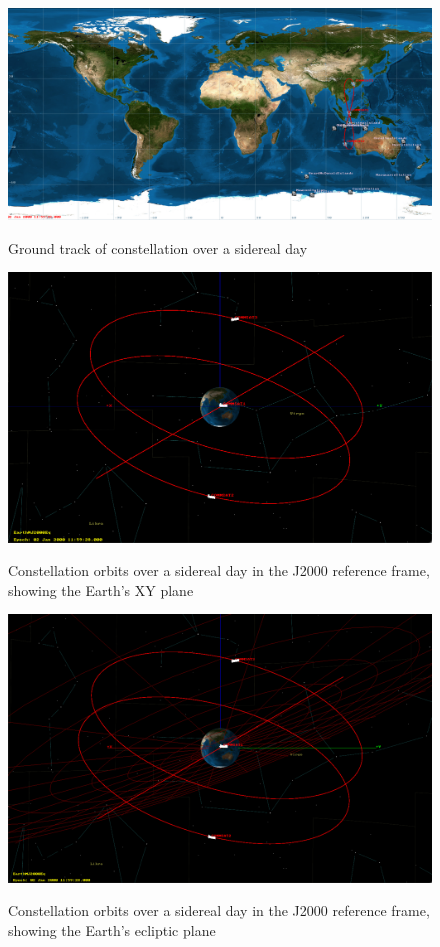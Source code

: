 \documentclass[12pt]{article}
\begin{document}
\begin{figure}[H]
    \centering
    \includegraphics[width=\linewidth]{figures/GroundTrack.png}\\
    \caption{Ground track of constellation over a sidereal day}
    \label{fig:ground_track}
\end{figure}
\begin{figure}[H]
    \centering
    \includegraphics[width=\linewidth]{figures/J2000XY.png}\\
    \caption{Constellation orbits over a sidereal day in the J2000 reference frame, showing the Earth's XY plane}
    \label{fig:j2000_xy}
\end{figure}
\begin{figure}[H]
    \centering
    \includegraphics[width=\linewidth]{figures/J2000Ecliptic.png}\\
    \caption{Constellation orbits over a sidereal day in the J2000 reference frame, showing the Earth's ecliptic plane}
    \label{fig:j2000_ecliptic}
\end{figure}
\end{document}
